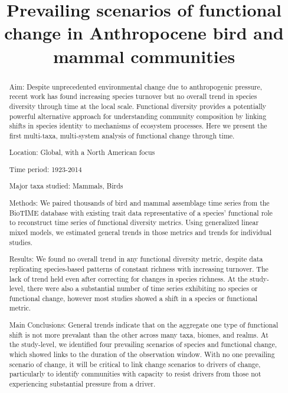 \documentclass{article}
\title{Prevailing scenarios of functional change in Anthropocene bird
and mammal communities}
\author{
  }
\begin{document}
\maketitle


\begin{abstract}
Aim: Despite unprecedented environmental change due to anthropogenic
pressure, recent work has found increasing species turnover but no
overall trend in species diversity through time at the local scale.
Functional diversity provides a potentially powerful alternative
approach for understanding community composition by linking shifts in
species identity to mechanisms of ecosystem processes. Here we present
the first multi-taxa, multi-system analysis of functional change through
time.

Location: Global, with a North American focus

Time period: 1923-2014

Major taxa studied: Mammals, Birds

Methods: We paired thousands of bird and mammal assemblage time series
from the BioTIME database with existing trait data representative of a
species' functional role to reconstruct time series of functional
diversity metrics. Using generalized linear mixed models, we estimated
general trends in those metrics and trends for individual studies.

Results: We found no overall trend in any functional diversity metric,
despite data replicating species-based patterns of constant richness
with increasing turnover. The lack of trend held even after correcting
for changes in species richness. At the study-level, there were also a
substantial number of time series exhibiting no species or functional
change, however most studies showed a shift in a species or functional
metric.

Main Conclusions: General trends indicate that on the aggregate one type
of functional shift is not more prevalant than the other across many
taxa, biomes, and realms. At the study-level, we identified four
prevailing scenarios of species and functional change, which showed
links to the duration of the observation window. With no one prevailing
scenario of change, it will be critical to link change scenarios to
drivers of change, particularly to identify communities with capacity to
resist drivers from those not experiencing substantial pressure from a
driver.
\end{abstract}

\end{document}
